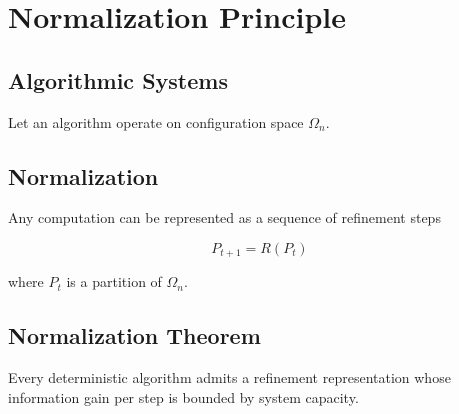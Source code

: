 \chapter{Normalization Principle}

\section{Algorithmic Systems}

Let an algorithm operate on configuration space \(\Omega_n\).

\section{Normalization}

Any computation can be represented as a sequence of refinement steps

\[
P_{t+1} = R(P_t)
\]

where \(P_t\) is a partition of \(\Omega_n\).

\section{Normalization Theorem}

\begin{theorem}
Every deterministic algorithm admits a refinement representation whose information gain per step is bounded by system capacity.
\end{theorem}
